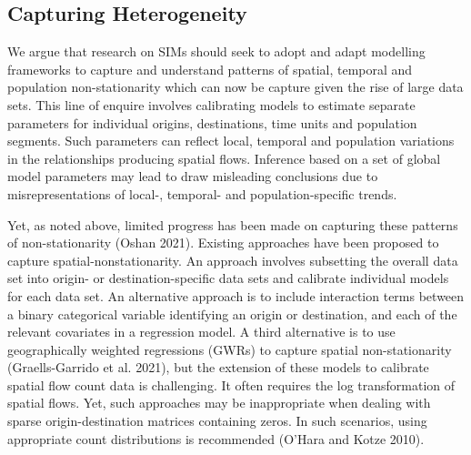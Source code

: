 \documentclass[11pt,letterpaper]{article}
\begin{document}
\hypertarget{capturing-heterogeneity}{%
\subsection{\texorpdfstring{Capturing Heterogeneity }{Capturing Heterogeneity }}\label{capturing-heterogeneity}}

We argue that research on SIMs should seek to adopt and adapt modelling frameworks to capture and understand patterns of spatial, temporal and population non-stationarity which can now be capture given the rise of large data sets.
This line of enquire involves calibrating models to estimate separate parameters for individual origins, destinations, time units and population segments.
Such parameters can reflect local, temporal and population variations in the relationships producing spatial flows.
Inference based on a set of global model parameters may lead to draw misleading conclusions due to misrepresentations of local-, temporal- and population-specific trends.

Yet, as noted above, limited progress has been made on capturing these patterns of non-stationarity (Oshan 2021).
Existing approaches have been proposed to capture spatial-nonstationarity.
An approach involves subsetting the overall data set into origin- or destination-specific data sets and calibrate individual models for each data set.
An alternative approach is to include interaction terms between a binary categorical variable identifying an origin or destination, and each of the relevant covariates in a regression model.
A third alternative is to use geographically weighted regressions (GWRs) to capture spatial non-stationarity (Graells-Garrido et al. 2021), but the extension of these models to calibrate spatial flow count data is challenging.
It often requires the log transformation of spatial flows.
Yet, such approaches may be inappropriate when dealing with sparse origin-destination matrices containing zeros.
In such scenarios, using appropriate count distributions is recommended (O'Hara and Kotze 2010).
\end{document}
